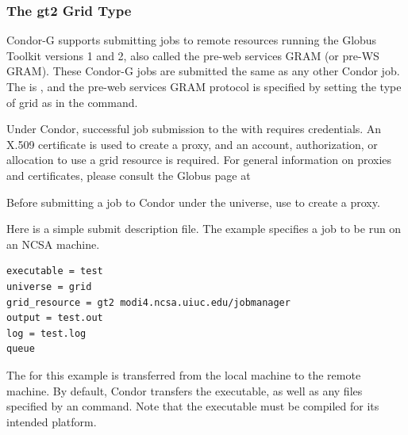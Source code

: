 \subsubsection{\label{sec:Using-gt2}The gt2 Grid Type}

Condor-G supports submitting jobs to remote resources running
the Globus Toolkit versions 1 and 2, also called the pre-web
services GRAM (or pre-WS GRAM).
These Condor-G jobs are submitted the same as any other Condor job.
The  is ,
and the pre-web services GRAM protocol is specified by
setting the type of grid as  in the 
command.

Under Condor, successful job submission to the  
 with 
requires credentials.
An X.509 certificate is used to create a proxy,
and an account, authorization, or allocation to use a grid resource
is required.
For general information on proxies and certificates,
please consult the Globus page at 


Before submitting a job to Condor under the  universe,
use  to create a proxy.

Here is a simple submit description file.
The example specifies a  job to be run on
an NCSA machine.

\begin{verbatim}
executable = test
universe = grid
grid_resource = gt2 modi4.ncsa.uiuc.edu/jobmanager
output = test.out
log = test.log
queue
\end{verbatim} 

The 
for this example is
transferred from the local machine to the remote machine.
By default, Condor transfers the executable, as well as any
files specified by an  command.
Note that the executable must be compiled for its intended platform.

